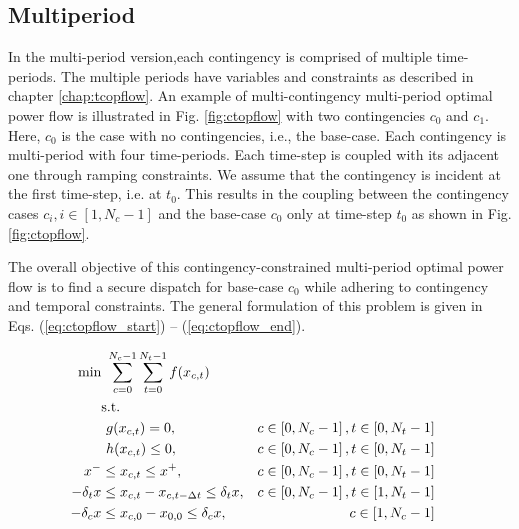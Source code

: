 \subsection{Multiperiod}

In the multi-period version,each contingency is comprised of multiple time-periods. The multiple periods have variables and constraints as described in chapter \ref{chap:tcopflow}. An example of multi-contingency multi-period optimal power flow is illustrated in Fig. \ref{fig:ctopflow} with two contingencies $c_0$ and $c_1$. Here, $c_0$ is the case with no contingencies, i.e., the base-case. Each contingency is multi-period with four time-periods. Each time-step is coupled with its adjacent one through ramping constraints. We assume that the contingency is incident at the first time-step, i.e. at $t_0$. This results in the coupling between the contingency cases $c_i, i \in [1,N_c-1]$ and the base-case $c_0$ only at time-step $t_0$ as shown in Fig. \ref{fig:ctopflow}.



The overall objective of this contingency-constrained multi-period optimal power flow is to find a secure dispatch for base-case $c_0$ while adhering to contingency and temporal constraints. The general formulation of this problem is given in Eqs. (\ref{eq:ctopflow_start}) -- (\ref{eq:ctopflow_end}).

\begin{align}
\centering
\text{min}&~\sum_{c=0}^{N_c-1}\sum_{t=0}^{N_t-1}f(x_{c,t})& \label{eq:ctopflow_start}\\
&\text{s.t.}& \nonumber \\
&~g(x_{c,t}) = 0,                                        &c \in \left[0,N_c-1\right], t \in \left[0,N_t-1\right]& \\
&~h(x_{c,t}) \le 0,                                      &c \in \left[0,N_c-1\right], t \in \left[0,N_t-1\right]& \\
x^- & \le x_{c,t} \le x^+,                               &c \in \left[0,N_c-1\right], t\in \left[0,N_t-1\right]& \\
-\delta_t{x} & \le x_{c,t} - x_{c,t-\Delta{t}} \le \delta_t{x},&c \in \left[0,N_c-1\right], t \in \left[1,N_t-1\right]& \label{eq:ctopflow_time_coupling}\\
-\delta_c{x} & \le x_{c,0} - x_{0,0} \le \delta_c{x},&c \in \left[1,N_c-1\right]& \\
\label{eq:ctopflow_end}
\end{align}


